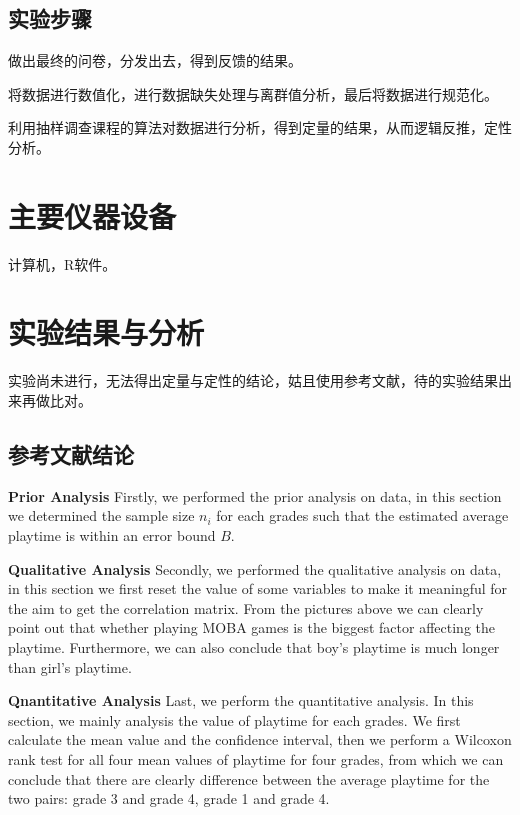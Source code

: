 \documentclass{zjureport}
\newenvironment{summary}[1]{\noindent\textbf{#1}}{\\[1cm]}
\begin{document}
  \subsection{实验步骤}
    \begin{clause}
      \item 做出最终的问卷，分发出去，得到反馈的结果。
      \item 将数据进行数值化，进行数据缺失处理与离群值分析，最后将数据进行规范化。
      \item 利用抽样调查课程的算法对数据进行分析，得到定量的结果，从而逻辑反推，定性分析。
    \end{clause}


\section{主要仪器设备}
  计算机，R软件。


\section{实验结果与分析}
  实验尚未进行，无法得出定量与定性的结论，姑且使用参考文献，待的实验结果出来再做比对。

  \subsection{参考文献结论}
    \begin{summary}{Prior Analysis}
      Firstly, we performed the prior analysis on data, in this section we determined the sample size $n_i$ for each grades such that the estimated average playtime is within an error bound $B$.
    \end{summary}

    \begin{summary}{Qualitative Analysis}
      Secondly, we performed the qualitative analysis on data, in this section we first reset the value of some variables to make it meaningful for the aim to get the correlation matrix. From the pictures above we can clearly point out that whether playing MOBA games is the biggest factor affecting the playtime. Furthermore, we can also conclude that boy's playtime is much longer than girl's playtime.
    \end{summary}

    \begin{summary}{Qnantitative Analysis}
      Last, we perform the quantitative analysis. In this section, we mainly analysis the value of playtime for each grades. We first calculate the mean value and the confidence interval, then we perform a Wilcoxon rank test for all four mean values of playtime for four grades, from which we can conclude that there are clearly difference between the average playtime  for the two pairs: grade 3 and grade 4, grade 1 and grade 4.
    \end{summary}
\end{document}
